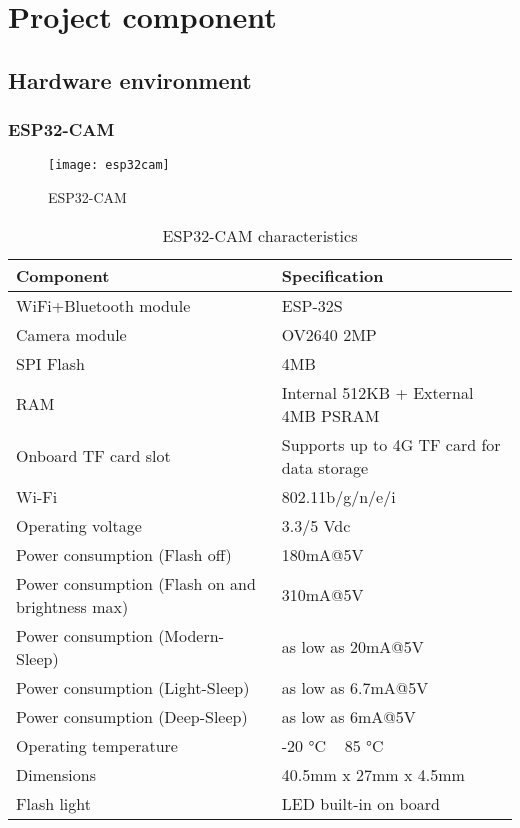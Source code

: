 \FloatBarrier




\section{Project component}
\subsection{Hardware environment}
\subsubsection{ESP32-CAM}
\FloatBarrier
\begin{figure}[h]
         \centering
        \texttt{[image: esp32cam]}
   
        \caption{ESP32-CAM}
        \label{fig:esp32cam}
    \end{figure}
\FloatBarrier
\FloatBarrier
\begin{table}[h]
\centering
\begin{tabular}{|l|l|}
\hline
\textbf{Component} & \textbf{Specification} \\ \hline
WiFi+Bluetooth module & ESP-32S \\ \hline
Camera module & OV2640 2MP \\ \hline
SPI Flash & 4MB \\ \hline
RAM & Internal 512KB + External 4MB PSRAM \\ \hline
Onboard TF card slot & Supports up to 4G TF card for data storage \\ \hline
Wi-Fi & 802.11b/g/n/e/i \\ \hline
Operating voltage & 3.3/5 Vdc \\ \hline
Power consumption (Flash off) & 180mA@5V \\ \hline
Power consumption (Flash on and brightness max) & 310mA@5V \\ \hline
Power consumption (Modern-Sleep) & as low as 20mA@5V \\ \hline
Power consumption (Light-Sleep) & as low as 6.7mA@5V \\ \hline
Power consumption (Deep-Sleep) & as low as 6mA@5V \\ \hline
Operating temperature & -20 °C ~ 85 °C \\ \hline
Dimensions & 40.5mm x 27mm x 4.5mm \\ \hline
Flash light & LED built-in on board \\ \hline
\end{tabular}
\caption{ESP32-CAM characteristics \cite{HT}}
\label{table:esp32-cam-characteristics}
\end{table}
\FloatBarrier

